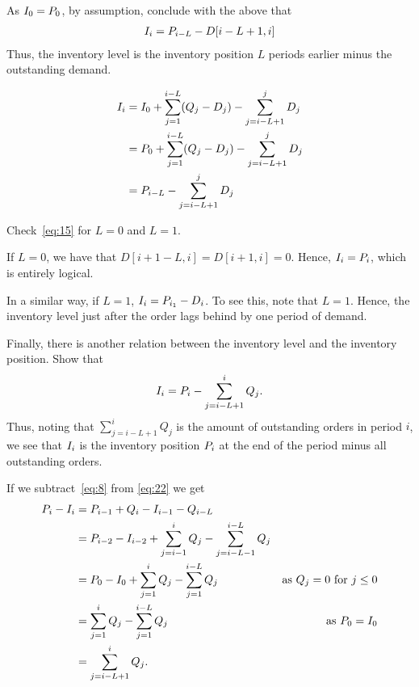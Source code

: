 \begin{exercise}
As $I_0 = P_0$, by assumption, conclude with the above that
\begin{align}\label{eq:15}
  I_i = P_{i-L} - D[i-L+1, i]
\end{align}
Thus, the inventory level is the inventory position $L$ periods earlier minus the outstanding demand. 
\begin{solution}
  \begin{align*}
    I_i
&= I_0 + \sum_{j=1}^{i-L} (Q_j-D_j) - \sum_{j=i-L+1}^j D_j \\
&= P_0 + \sum_{j=1}^{i-L} (Q_j-D_j) - \sum_{j=i-L+1}^j D_j \\
&= P_{i-L} - \sum_{j=i-L+1}^j D_j \\
  \end{align*}
\end{solution}
\end{exercise}


\begin{exercise}
Check~\eqref{eq:15} for $L=0$ and $L=1$.
  \begin{solution}
    If $L=0$, we have that $D[i+1-L,i] = D[i+1,i] = 0$. Hence, $I_i = P_i$, which is entirely logical. 

In a similar way, if $L=1$, $I_i = P_{i_1} - D_{i}$. To see this, note that $L=1$. Hence, the  inventory level just after the order lags behind by one period of demand. 
  \end{solution}
\end{exercise}

\begin{exercise}
Finally, there is another relation between the inventory level and the inventory position. Show that
  \begin{equation}\label{eq:7}
    I_i = P_i - \sum_{j=i-L+1}^i Q_j.
  \end{equation}
Thus, noting that $\sum_{j=i-L+1}^i Q_j$ is the amount of outstanding orders in period $i$, we see that $I_i$ is the inventory position $P_i$ at the end of the period minus all outstanding orders.
\begin{solution}
  If we   subtract~\eqref{eq:8} from \eqref{eq:22} we get 
  \begin{align*}
    P_i - I_i 
&= P_{i-1} + Q_{i} - I_{i-1} - Q_{i-L} \\
&= P_{i-2} - I_{i-2} + \sum_{j=i-1}^i Q_{j} - \sum_{j=i-L-1}^{i-L} Q_{j} \\
&= P_{0} - I_{0} + \sum_{j=1}^i Q_{j} - \sum_{j=1}^{i-L} Q_{j} &\text{as $Q_j=0$ for $j\leq 0$}\\
&= \sum_{j=1}^i Q_{j} - \sum_{j=1}^{i-L} Q_{j} &\text{as }P_0 = I_0\\
&= \sum_{j=i-L+1}^i Q_{j}.
  \end{align*}
\end{solution}
\end{exercise}

